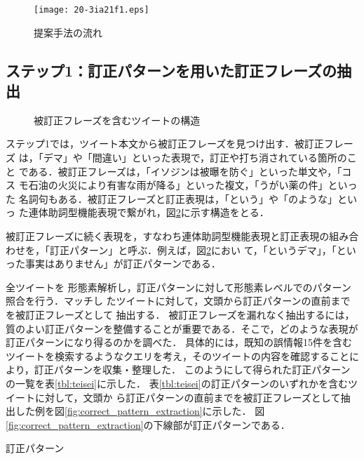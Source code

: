 \documentclass[japanese]{jnlp_1.4}
\begin{document}
\begin{figure}[b]
\begin{center}
  \texttt{[image: 20-3ia21f1.eps]}
\end{center}
 \caption{提案手法の流れ}
 \label{fig:zentai}
\end{figure}


\subsection{ステップ1：訂正パターンを用いた訂正フレーズの抽出}

\begin{figure}[b]
\begin{center}

\end{center}
 \caption{被訂正フレーズを含むツイートの構造}
 \label{fig:correct_pattern}
\end{figure}

ステップ1では，ツイート本文から被訂正フレーズを見つけ出す．被訂正フレーズ
は，「デマ」や「間違い」といった表現で，訂正や打ち消されている箇所のこと
である．被訂正フレーズは，「イソジンは被曝を防ぐ」といった単文や，「コス
モ石油の火災により有害な雨が降る」といった複文，「うがい薬の件」といった
名詞句もある．被訂正フレーズと訂正表現は，「という」や「のような」といっ
た連体助詞型機能表現で繋がれ，図\ref{fig:correct_pattern}に示す構造をとる．

被訂正フレーズに続く表現を，すなわち連体助詞型機能表現と訂正表現の組み合
わせを，「訂正パターン」と呼ぶ．例えば，図\ref{fig:correct_pattern}におい
て，「というデマ」，「といった事実はありません」が訂正パターンである．

全ツイートを
形態素解析し，訂正パターンに対して形態素レベルでのパターン照合を行う．マッチし
たツイートに対して，文頭から訂正パターンの直前までを被訂正フレーズとして
抽出する．
被訂正フレーズを漏れなく抽出するには，質のよい訂正パターンを整備することが重要である．そこで，どのような表現が訂正パターンになり得るのかを調べた．
具体的には，既知の誤情報15件を含むツイートを検索するようなクエリを考え，そのツイートの内容を確認することにより，訂正パターンを収集・整理した．
このようにして得られた訂正パターンの一覧を表\ref{tbl:teisei}に示した．
表\ref{tbl:teisei}の訂正パターンのいずれかを含むツイートに対して，文頭か
ら訂正パターンの直前までを被訂正フレーズとして抽出した例を図\ref{fig:correct_pattern_extraction}に示した．
図\ref{fig:correct_pattern_extraction}の下線部が訂正パターンである．

\begin{table}[t]
 \caption{訂正パターン}
 \label{tbl:teisei}

\end{table}
\end{document}

